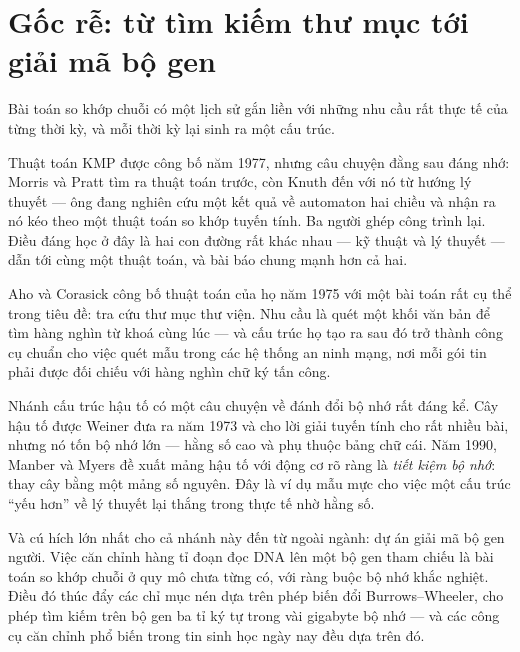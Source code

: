\documentclass[../../algorithm.tex]{subfiles}
\begin{document}
\section{Gốc rễ: từ tìm kiếm thư mục tới giải mã bộ gen}

Bài toán so khớp chuỗi có một lịch sử gắn liền với những nhu cầu rất thực tế của từng thời kỳ, và mỗi thời kỳ lại sinh ra một cấu trúc.

Thuật toán KMP được công bố năm 1977\cite{kmp1977}, nhưng câu chuyện đằng sau đáng nhớ: Morris và Pratt tìm ra thuật toán trước, còn Knuth đến với nó từ hướng lý thuyết --- ông đang nghiên cứu một kết quả về automaton hai chiều và nhận ra nó kéo theo một thuật toán so khớp tuyến tính. Ba người ghép công trình lại. Điều đáng học ở đây là hai con đường rất khác nhau --- kỹ thuật và lý thuyết --- dẫn tới cùng một thuật toán, và bài báo chung mạnh hơn cả hai.

Aho và Corasick công bố thuật toán của họ năm 1975\cite{ahocorasick1975} với một bài toán rất cụ thể trong tiêu đề: tra cứu thư mục thư viện. Nhu cầu là quét một khối văn bản để tìm hàng nghìn từ khoá cùng lúc --- và cấu trúc họ tạo ra sau đó trở thành công cụ chuẩn cho việc quét mẫu trong các hệ thống an ninh mạng, nơi mỗi gói tin phải được đối chiếu với hàng nghìn chữ ký tấn công.

Nhánh cấu trúc hậu tố có một câu chuyện về đánh đổi bộ nhớ rất đáng kể. Cây hậu tố được Weiner đưa ra năm 1973 và cho lời giải tuyến tính cho rất nhiều bài, nhưng nó tốn bộ nhớ lớn --- hằng số cao và phụ thuộc bảng chữ cái. Năm 1990, Manber và Myers\cite{manber1993} đề xuất mảng hậu tố với động cơ rõ ràng là \emph{tiết kiệm bộ nhớ}: thay cây bằng một mảng số nguyên. Đây là ví dụ mẫu mực cho việc một cấu trúc ``yếu hơn'' về lý thuyết lại thắng trong thực tế nhờ hằng số.

Và cú hích lớn nhất cho cả nhánh này đến từ ngoài ngành: dự án giải mã bộ gen người. Việc căn chỉnh hàng tỉ đoạn đọc DNA lên một bộ gen tham chiếu là bài toán so khớp chuỗi ở quy mô chưa từng có, với ràng buộc bộ nhớ khắc nghiệt. Điều đó thúc đẩy các chỉ mục nén dựa trên phép biến đổi Burrows--Wheeler, cho phép tìm kiếm trên bộ gen ba tỉ ký tự trong vài gigabyte bộ nhớ --- và các công cụ căn chỉnh phổ biến trong tin sinh học ngày nay đều dựa trên đó.
\end{document}
